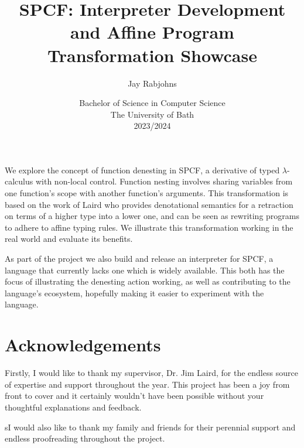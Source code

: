 \documentclass[12pt,a4paper]{report}
\title{SPCF: Interpreter Development and Affine Program Transformation Showcase}
\author{Jay Rabjohns}
\date{Bachelor of Science in Computer Science\\ 
      The University of Bath\\
      2023/2024}
\theoremstyle{definition}
\theoremstyle{definition}
\theoremstyle{remark}
\begin{document}
\hypersetup{pageanchor=false}

\lstset{language=Haskell,breaklines,breakatwhitespace,basicstyle=\small}

\setcounter{page}{0}

\maketitle
\newpage

\newpage

\hypersetup{pageanchor=true}
\abstract

We explore the concept of function denesting in SPCF, a derivative of typed $\lambda$-calculus with non-local control. Function nesting involves sharing variables from one function’s scope with another function's arguments. This transformation is based on the work of Laird who provides denotational semantics for a retraction on terms of a higher type into a lower one, and can be seen as rewriting programs to adhere to affine typing rules. We illustrate this transformation working in the real world and evaluate its benefits. 

As part of the project we also build and release an interpreter for SPCF, a language that currently lacks one which is widely available. This both has the focus of illustrating the denesting action working, as well as contributing to the language’s ecosystem, hopefully making it easier to experiment with the language.
\newpage

\tableofcontents
\newpage

\listoffigures
\newpage

\listoftables
\newpage

\chapter*{Acknowledgements}
Firstly, I would like to thank my supervisor, Dr. Jim Laird, for the endless source of expertise and support throughout the year. This project has been a joy from front to cover and it certainly wouldn't have been possible without your thoughtful explanations and feedback.

sI would also like to thank my family and friends for their perennial support and endless proofreading throughout the project.
\end{document}
